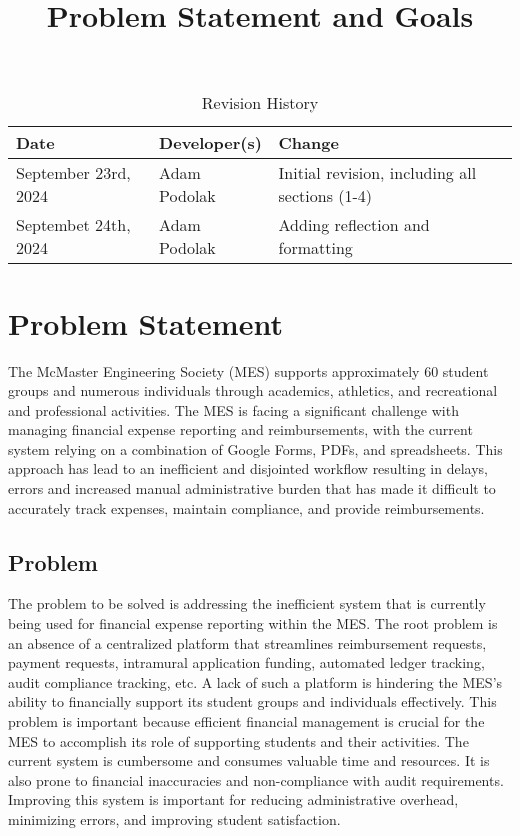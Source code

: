 \documentclass{article}
\title{Problem Statement and Goals\\\progname}
\author{\authname}
\date{}
\begin{document}
\maketitle

\begin{table}[hp]
\caption{Revision History} \label{TblRevisionHistory}
\begin{tabularx}{\textwidth}{llX}
\toprule
\textbf{Date} & \textbf{Developer(s)} & \textbf{Change}\\
\midrule
September 23rd, 2024 & Adam Podolak & Initial revision, including all sections (1-4)\\
Septembet 24th, 2024 & Adam Podolak & Adding reflection and formatting\\
\bottomrule
\end{tabularx}
\end{table}

\section{Problem Statement}



The McMaster Engineering Society (MES) supports approximately 60 student groups and numerous individuals through academics, athletics, and recreational and professional activities. The MES is facing a significant challenge with managing financial expense reporting and reimbursements, with the current system relying on a combination of Google Forms, PDFs, and spreadsheets. This approach has lead to an inefficient and disjointed workflow resulting in delays, errors and increased manual administrative burden that has made it difficult to accurately track expenses, maintain compliance, and provide reimbursements. 

\subsection{Problem}

The problem to be solved is addressing the inefficient system that is currently being used for financial expense reporting within the MES. The root problem is an absence of a centralized platform that streamlines reimbursement requests, payment requests, intramural application funding, automated ledger tracking, audit compliance tracking, etc. A lack of such a platform is hindering the MES's ability to financially support its student groups and individuals effectively. This problem is important because efficient financial management is crucial for the MES to accomplish its role of supporting students and their activities. The current system is cumbersome and consumes valuable time and resources. It is also prone to financial inaccuracies and non-compliance with audit requirements. Improving this system is important for reducing administrative overhead, minimizing errors, and improving student satisfaction.
\end{document}
